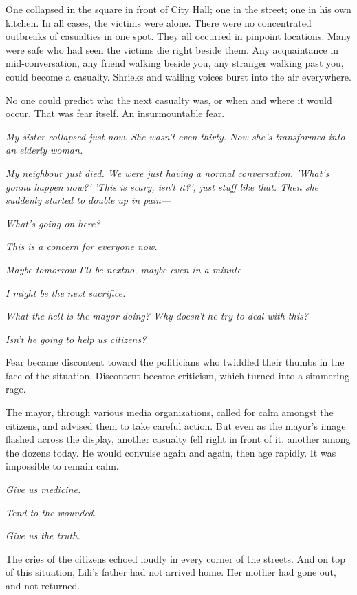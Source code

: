 One collapsed in the square in front of City Hall; one in the street;
one in his own kitchen. In all cases, the victims were alone. There were
no concentrated outbreaks of casualties in one spot. They all occurred
in pinpoint locations. Many were safe who had seen the victims die right
beside them. Any acquaintance in mid-conversation, any friend walking
beside you, any stranger walking past you, could become a casualty.
Shrieks and wailing voices burst into the air everywhere.

No one could predict who the next casualty was, or when and where it
would occur. That was fear itself. An insurmountable fear.

\emph{My sister collapsed just now. She wasn't even thirty. Now she's
transformed into an elderly woman.}

\emph{My neighbour just died. We were just having a normal conversation.
'What's gonna happen now?' 'This is scary, isn't it?', just stuff like
that. Then she suddenly started to double up in pain---}

\emph{What's going on here?}

\emph{This is a concern for everyone now.}

\emph{Maybe tomorrow I'll be next\el no, maybe even in a minute\el }

\emph{I might be the next sacrifice.}

\emph{What the hell is the mayor doing? Why doesn't he try to deal with this?}

\emph{Isn't he going to help us citizens?}

Fear became discontent toward the politicians who twiddled their thumbs
in the face of the situation. Discontent became criticism, which turned
into a simmering rage.

The mayor, through various media organizations, called for calm amongst
the citizens, and advised them to take careful action. But even as the
mayor's image flashed across the display, another casualty fell right in
front of it, another among the dozens today. He would convulse again and
again, then age rapidly. It was impossible to remain calm.

\emph{Give us medicine.}

\emph{Tend to the wounded.}

\emph{Give us the truth.}

The cries of the citizens echoed loudly in every corner of the streets.
And on top of this situation, Lili's father had not arrived home. Her
mother had gone out, and not returned.

